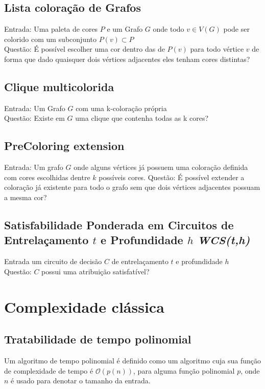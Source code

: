 \subsection{Lista coloração de Grafos}
\begin{definition}
  Entrada: Uma paleta de cores $P$ e um Grafo $G$ onde todo $v \in V(G)$ pode ser colorido com um subconjunto $P(v) \subset P$\\
  Questão: É possível escolher uma cor dentro das de $P(v)$ para todo vértice $v$ de forma que dado quaisquer dois vértices adjacentes eles tenham cores distintas?
\end{definition}

\subsection{Clique multicolorida}
\begin{definition}
 Entrada: Um Grafo $G$ com uma k-coloração própria\\
 Questão: Existe em $G$ uma clique que contenha todas as k cores?
\end{definition}

\subsection{PreColoring extension}
\begin{definition}
 Entrada: Um grafo $G$ onde alguns vértices já possuem uma coloração definida com cores escolhidas dentre $k$ possíveis cores.
 Questão: É possível extender a coloração já existente para todo o grafo sem que dois vértices adjacentes possuam a mesma cor? 
\end{definition}

\subsection{Satisfabilidade Ponderada em Circuitos de Entrelaçamento $t$ e Profundidade $h$ \emph{WCS(t,h)}}
\begin{definition}
 Entrada um circuito de decisão $C$ de entrelaçamento $t$ e profundidade $h$\\
 Questão: $C$ possui uma atribuição satisfatível?
\end{definition}

\section{Complexidade clássica}
\subsection{Tratabilidade de tempo polinomial}
Um algoritmo de tempo polinomial é definido como um algoritmo cuja sua função de complexidade de tempo é $\mathcal{O}(p(n))$, para alguma função polinomial $p$, onde $n$ é usado para denotar o tamanho da entrada.

